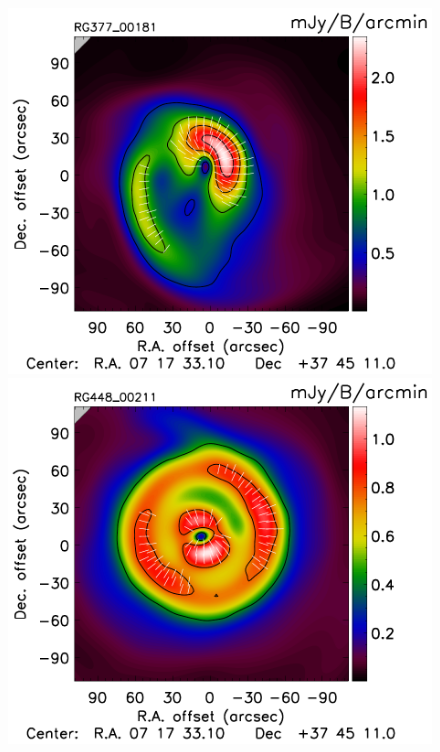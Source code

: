 \documentclass[twocolumn,traditabstract]{aa}
\begin{document}
\begin{figure}[h]
\includegraphics[trim=0cm 0.7cm 0cm 0cm, clip=true, totalheight=3.6cm]{Figure/Grad_RG377_00181_Ymap_zobs0p5_regrid_15_15_45.pdf}
\includegraphics[trim=0cm 0.7cm 0cm 0cm, clip=true, totalheight=3.6cm]{Figure/Grad_RG448_00211_Ymap_zobs0p4_regrid_15_15_45.pdf}

\end{figure}
\end{document}

